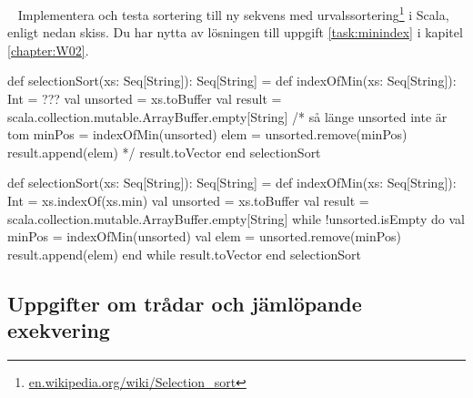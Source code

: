 \clearpage




\QUESTBEGIN

\Task  \what~ Implementera och testa sortering till ny sekvens med urvalssortering\footnote{\href{https://en.wikipedia.org/wiki/Selection_sort}{en.wikipedia.org/wiki/Selection\_sort}} i Scala, enligt nedan skiss.  Du har nytta av lösningen till uppgift \ref{task:minindex} i kapitel \ref{chapter:W02}.
\begin{Code}
def selectionSort(xs: Seq[String]): Seq[String] = 
  def indexOfMin(xs: Seq[String]): Int = ???
  val unsorted = xs.toBuffer
  val result = scala.collection.mutable.ArrayBuffer.empty[String]
  /*
  så länge unsorted inte är tom 
    minPos = indexOfMin(unsorted)
    elem   = unsorted.remove(minPos)
    result.append(elem)
  */
  result.toVector
end selectionSort
\end{Code}



\SOLUTION


\TaskSolved \what


\begin{Code}
def selectionSort(xs: Seq[String]): Seq[String] = 
  def indexOfMin(xs: Seq[String]): Int = xs.indexOf(xs.min)
  val unsorted = xs.toBuffer
  val result = scala.collection.mutable.ArrayBuffer.empty[String]
  while !unsorted.isEmpty do
    val minPos = indexOfMin(unsorted)
    val elem = unsorted.remove(minPos)
    result.append(elem)
  end while
  result.toVector
end selectionSort
\end{Code}


\QUESTEND














%
%
%
%
%
%
%
%
%
%
%


\subsection{Uppgifter om trådar och jämlöpande exekvering}

